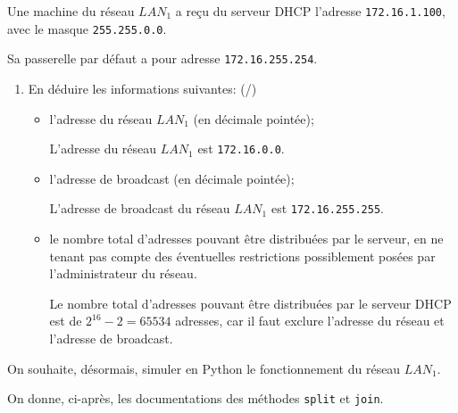 Une machine du réseau $LAN_1$ a reçu du serveur DHCP l'adresse \verb|172.16.1.100|, avec le masque \verb|255.255.0.0|.

Sa passerelle par défaut a pour adresse \verb|172.16.255.254|.

\begin{enumerate}[resume=monDS]
    \item En déduire les informations suivantes: (/)
    \begin{itemize}
        \item l'adresse du réseau $LAN_1$ (en décimale pointée);
        
        \begin{blocvisiblex}[height=1]
            {\quad}
            L'adresse du réseau $LAN_1$ est \texttt{172.16.0.0}.
        \end{blocvisiblex}
        \item l'adresse de broadcast (en décimale pointée);
        \begin{blocvisiblex}[height=1]
            {\quad}
            L'adresse de broadcast du réseau $LAN_1$ est \texttt{172.16.255.255}.
        \end{blocvisiblex}
        
        \item le nombre total d'adresses pouvant être distribuées par le serveur, en ne tenant pas compte des éventuelles restrictions possiblement posées par l'administrateur du réseau.
        \begin{blocvisiblex}[height=1.5]
            {\quad}
            Le nombre total d'adresses pouvant être distribuées par le serveur DHCP est de $2^{16} - 2 = 65534$ adresses, car il faut exclure l'adresse du réseau et l'adresse de broadcast.
        \end{blocvisiblex}
    \end{itemize}
\end{enumerate}

\bigskip

On souhaite, désormais, simuler en Python le fonctionnement du réseau $LAN_1$.

On donne, ci-après, les documentations des méthodes \verb|split| et \verb|join|.

